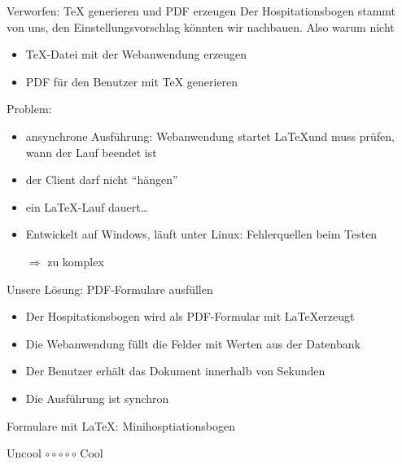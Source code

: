 \documentclass{beamer}
\begin{document}
\begin{frame}{Verworfen: TeX generieren und PDF erzeugen}
Der Hospitationsbogen stammt von uns, den Einstellungsvorschlag könnten wir nachbauen. Also warum nicht
\begin{itemize}
	\item TeX-Datei mit der Webanwendung erzeugen
	\item PDF für den Benutzer mit TeX generieren
\end{itemize}
Problem:
\begin{itemize}
\item ansynchrone Ausführung: Webanwendung startet \LaTeX und muss prüfen, wann der Lauf beendet ist
\item der Client darf nicht \enquote{hängen}
\item ein \LaTeX -Lauf dauert\ldots
\item Entwickelt auf Windows, läuft unter Linux: Fehlerquellen beim Testen
\item[$\Rightarrow$] zu komplex
\end{itemize}
\end{frame}

\begin{frame}{Unsere Lösung: PDF-Formulare ausfüllen}
\begin{itemize}
\item Der Hospitationsbogen wird als PDF-Formular mit \LaTeX erzeugt
\item Die Webanwendung füllt die Felder mit Werten aus der Datenbank
\item Der Benutzer erhält das Dokument innerhalb von Sekunden
\item Die Ausführung ist synchron
\end{itemize}
\end{frame}



\begin{frame}{Formulare mit \LaTeX: Minihosptiationsbogen}
	\begin{framed}

	    \hrulefill

    	\begin{center}
        	\Huge
	        Uncool\hspace{0.5em}
    	    $\circ\circ\circ\circ\circ$
        	\hspace{0.5em} Cool
	    \end{center}
    	\smallskip
	\end{framed}
\end{frame}
\end{document}
